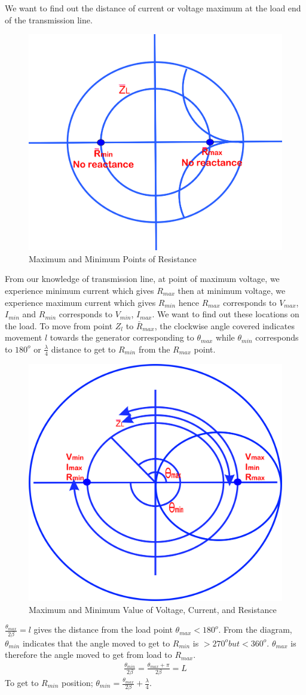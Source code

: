 We want to find out the distance of current or voltage maximum at the load end of the transmission line.
\begin{figure}[h]
\centering
\includegraphics[width=0.7\linewidth]{./graphics/oijhgfdsa}
\caption{Maximum and Minimum Points of Resistance}
\label{fig:oijhgfdsa}
\end{figure}

From our knowledge of transmission line, at point of maximum voltage, we experience minimum current which gives $R_{max}$ then at minimum voltage, we experience maximum current which gives $R_{min}$ hence $R_{max}$ corresponds to $V_{max}$,  $I_{min}$ and  $R_{min}$ corresponds to  $V_{min}$, $I_{max}$.  We want to find out these locations on the load. To move from point $Z_{l}$ to $\bar{R}_{max}$, the clockwise angle covered indicates movement $l$ towards the generator corresponding to $\theta_{max}$ while $\theta_{min}$ corresponds to $180^o$ or $\frac{\lambda}{4}$ distance to get to $R_{min}$ from the $R_{max}$ point.
\begin{figure}[h]
\centering
\includegraphics[width=0.6\linewidth]{./graphics/lkjtresx}
\caption{Maximum and Minimum Value of Voltage, Current, and Resistance}
\label{fig:lkjtresx}
\end{figure}

$\frac{\theta_{max}}{2\beta}=l$ gives the distance from the load point $\theta_{max} < 180^o$. From the diagram, $\theta_{min}$ indicates that the angle moved to get to $R_{min}$ is $>270^o but <360^o$. $\theta_{max}$ is therefore the angle moved to get from load to $R_{max}$.
\begin{align}
\frac{\theta_{min}}{2\beta}=\frac{\theta_{max} + \pi}{2\beta} = L
\end{align}
To get to $R_{min}$ position; $\theta_{min} = \frac{\theta_{max}}{2\beta} + \frac{\lambda}{4}.$ 